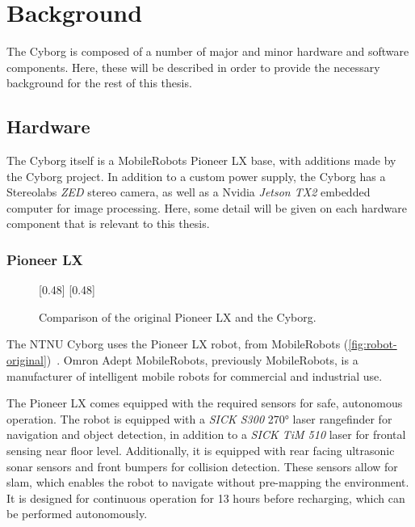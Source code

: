 \documentclass[\rootfolder/main.tex]{subfiles}
\begin{document}
\chapter{Background}
\label{ch:background}

The Cyborg is composed of a number of major and minor hardware and software components.
Here, these will be described in order to provide the necessary background for the rest of this thesis.


\section{Hardware}

The Cyborg itself is a MobileRobots Pioneer LX base, with additions made by the Cyborg project.
In addition to a custom power supply, the Cyborg has a Stereolabs \emph{ZED} stereo camera, as well as a Nvidia \emph{Jetson TX2} embedded computer for image processing.
Here, some detail will be given on each hardware component that is relevant to this thesis.


\subsection{Pioneer LX}

\begin{figure}[h]
    \centering
    [0.48\columnwidth]{}%
    [0.48\columnwidth]{}
    \caption{Comparison of the original Pioneer LX and the Cyborg.}
    \label{fig:robot-comparison}
\end{figure}

The NTNU Cyborg uses the Pioneer LX robot, from MobileRobots (\cref{fig:robot-original})~\cite{MobileRobots}.
Omron Adept MobileRobots, previously MobileRobots, is a manufacturer of intelligent mobile robots for commercial and industrial use.

The Pioneer LX comes equipped with the required sensors for safe, autonomous operation.
The robot is equipped with a \emph{SICK S300} \ang{270} laser rangefinder for navigation and object detection, in addition to a \emph{SICK TiM 510} laser for frontal sensing near floor level.
Additionally, it is equipped with rear facing ultrasonic sonar sensors and front bumpers for collision detection.
These sensors allow for \acrfull{slam}, which enables the robot to navigate without pre-mapping the environment.
It is designed for continuous operation for 13 hours before recharging, which can be performed autonomously.
\end{document}
